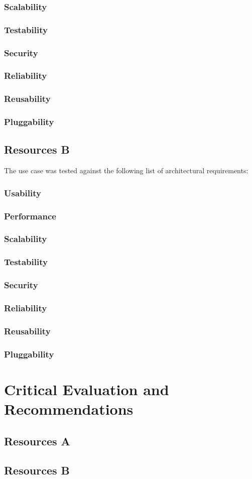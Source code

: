 \documentclass[a4paper]{article}
\begin{document}
\subsubsection {Scalability}
\subsubsection {Testability}
\subsubsection {Security}
\subsubsection {Reliability}
\subsubsection {Reusability}
\subsubsection {Pluggability}


\subsection {Resources B}
The use case was tested against the following list of architectural requirements:
\subsubsection {Usability}
\subsubsection {Performance}
\subsubsection {Scalability}
\subsubsection {Testability}
\subsubsection {Security}
\subsubsection {Reliability}
\subsubsection {Reusability}
\subsubsection {Pluggability}


\section {Critical Evaluation and Recommendations}
\subsection {Resources A}
\subsection {Resources B}
\end{document}
